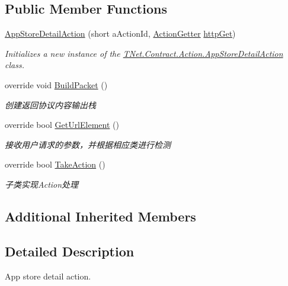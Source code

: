 \subsection*{Public Member Functions}
\begin{DoxyCompactItemize}
\item 
\mbox{\hyperlink{class_t_net_1_1_contract_1_1_action_1_1_app_store_detail_action_a513076b39d15f51ae91de1f5080b3a34}{App\+Store\+Detail\+Action}} (short a\+Action\+Id, \mbox{\hyperlink{class_t_net_1_1_service_1_1_action_getter}{Action\+Getter}} \mbox{\hyperlink{class_t_net_1_1_service_1_1_base_struct_a04c1171f14d9ee44612f9966a8d61d30}{http\+Get}})
\begin{DoxyCompactList}\small\item\em Initializes a new instance of the \mbox{\hyperlink{class_t_net_1_1_contract_1_1_action_1_1_app_store_detail_action}{T\+Net.\+Contract.\+Action.\+App\+Store\+Detail\+Action}} class. \end{DoxyCompactList}\item 
override void \mbox{\hyperlink{class_t_net_1_1_contract_1_1_action_1_1_app_store_detail_action_a036adb761ead3ae30b7f2e2cd33f2eaa}{Build\+Packet}} ()
\begin{DoxyCompactList}\small\item\em 创建返回协议内容输出栈 \end{DoxyCompactList}\item 
override bool \mbox{\hyperlink{class_t_net_1_1_contract_1_1_action_1_1_app_store_detail_action_ab8bc090e0a3f36cf0e90a693e12d183a}{Get\+Url\+Element}} ()
\begin{DoxyCompactList}\small\item\em 接收用户请求的参数，并根据相应类进行检测 \end{DoxyCompactList}\item 
override bool \mbox{\hyperlink{class_t_net_1_1_contract_1_1_action_1_1_app_store_detail_action_a16a7cfa158cd14c46c4c665c49c7ded4}{Take\+Action}} ()
\begin{DoxyCompactList}\small\item\em 子类实现\+Action处理 \end{DoxyCompactList}\end{DoxyCompactItemize}
\subsection*{Additional Inherited Members}


\subsection{Detailed Description}
App store detail action. 



